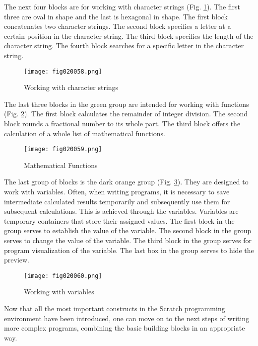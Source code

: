 The next four blocks are for working with character strings (Fig. \ref{fig020058}). The first three are oval in shape and the last is hexagonal in shape. The first block concatenates two character strings. The second block specifies a letter at a certain position in the character string. The third block specifies the length of the character string. The fourth block searches for a specific letter in the character string.

\begin{figure}[H]
   \centering
   \texttt{[image: fig020058.png]}
   \caption{Working with character strings}
\label{fig020058}
\end{figure}

The last three blocks in the green group are intended for working with functions (Fig. \ref{fig020059}). The first block calculates the remainder of integer division. The second block rounds a fractional number to its whole part. The third block offers the calculation of a whole list of mathematical functions.

\begin{figure}[H]
   \centering
   \texttt{[image: fig020059.png]}
   \caption{Mathematical Functions}
\label{fig020059}
\end{figure}

The last group of blocks is the dark orange group (Fig. \ref{fig020060}). They are designed to work with variables. Often, when writing programs, it is necessary to save intermediate calculated results temporarily and subsequently use them for subsequent calculations. This is achieved through the variables. Variables are temporary containers that store their assigned values. The first block in the group serves to establish the value of the variable. The second block in the group serves to change the value of the variable. The third block in the group serves for program visualization of the variable. The last box in the group serves to hide the preview.

\begin{figure}[H]
   \centering
   \texttt{[image: fig020060.png]}
   \caption{Working with variables}
\label{fig020060}
\end{figure}

Now that all the most important constructs in the Scratch programming environment have been introduced, one can move on to the next steps of writing more complex programs, combining the basic building blocks in an appropriate way.

